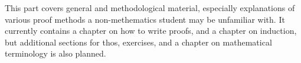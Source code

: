 \documentclass[../../include/open-logic-part]{subfiles}
\begin{document}

\begin{editorial}
  This part covers general and methodological material, especially
  explanations of various proof methods a non-methematics student may
  be unfamiliar with. It currently contains a chapter on how to write
  proofs, and a chapter on induction, but additional sections for
  thos, exercises, and a chapter on mathematical terminology is also
  planned.
\end{editorial}



\OLEndPartHook
\end{document}

